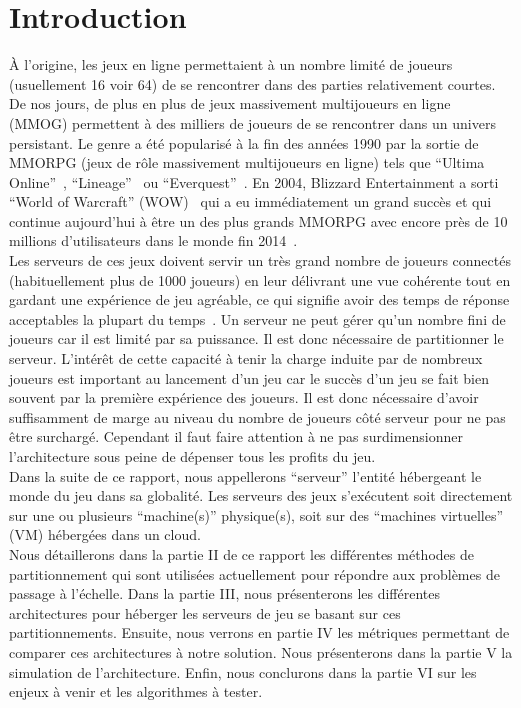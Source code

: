 \section{Introduction}
\`A l'origine, les jeux en ligne permettaient à un nombre limité de joueurs (usuellement 16 voir 64) de se rencontrer dans des parties relativement courtes. De nos jours, de plus en plus de jeux massivement multijoueurs en ligne (MMOG) permettent à des milliers de joueurs de se rencontrer dans un univers persistant. Le genre a été popularisé à la fin des années 1990 par la sortie de MMORPG (jeux de rôle massivement multijoueurs en ligne) tels que ``Ultima Online''~\cite{ultima_online}, ``Lineage''~\cite{lineage} ou ``Everquest''~\cite{everquest}. En 2004, Blizzard Entertainment a sorti ``World of Warcraft'' (WOW)~\cite{wow} qui a eu immédiatement un grand succès et qui continue aujourd'hui à être un des plus grands MMORPG avec encore près de 10 millions d'utilisateurs dans le monde fin 2014~\cite{wow_player_num}.\\

Les serveurs de ces jeux doivent servir un très grand nombre de joueurs connectés (habituellement plus de 1000 joueurs) en leur délivrant une vue cohérente tout en gardant une expérience de jeu agréable, ce qui signifie avoir des temps de réponse acceptables la plupart du temps~\cite{latency_can_kill}. Un serveur ne peut gérer qu'un nombre fini de joueurs car il est limité par sa puissance. Il est donc nécessaire de partitionner le serveur. L'intérêt de cette capacité à tenir la charge induite par de nombreux joueurs est important au lancement d'un jeu car le succès d'un jeu se fait bien souvent par la première expérience des joueurs. Il est donc nécessaire d'avoir suffisamment de marge au niveau du nombre de joueurs côté serveur pour ne pas être surchargé. Cependant il faut faire attention à ne pas surdimensionner l'architecture sous peine de dépenser tous les profits du jeu.\\

Dans la suite de ce rapport, nous appellerons ``serveur'' l'entité hébergeant le monde du jeu dans sa globalité. Les serveurs des jeux s'exécutent soit directement sur une ou plusieurs ``machine(s)'' physique(s), soit sur des ``machines virtuelles'' (VM) hébergées dans un cloud.\\

Nous détaillerons dans la partie II de ce rapport les différentes méthodes de partitionnement qui sont utilisées actuellement pour répondre aux problèmes de passage à l'échelle. Dans la partie III, nous présenterons les différentes architectures pour héberger les serveurs de jeu se basant sur ces partitionnements. Ensuite, nous verrons en partie IV les métriques permettant de comparer ces architectures à notre solution. Nous présenterons dans la partie V la simulation de l'architecture. Enfin, nous conclurons dans la partie VI sur les enjeux à venir et les algorithmes à tester.
